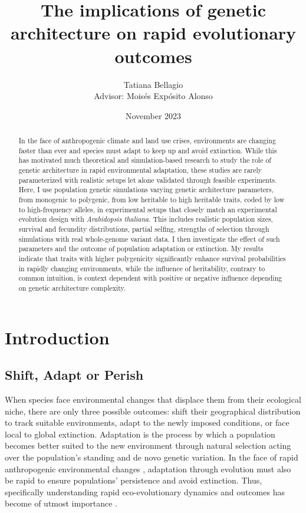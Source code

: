 \documentclass{article}
\title{The implications of genetic architecture on rapid evolutionary outcomes} %
\author{Tatiana Bellagio \\ Advisor: Moisés Expósito Alonso}
\date{November 2023}
\begin{document}
\maketitle

\begin{abstract}
In the face of anthropogenic climate and land use crises, environments are changing faster than ever and species must adapt to keep up and avoid extinction. While this has motivated much theoretical and simulation-based research to study the role of genetic architecture in rapid environmental adaptation, these studies are rarely parameterized with realistic setups let alone validated through feasible experiments. Here, I use population genetic simulations varying genetic architecture parameters, from monogenic to polygenic, from low heritable to high heritable traits, coded by low to high-frequency alleles, in experimental setups that closely match an experimental evolution design with \textit{Arabidopsis thaliana}. This includes realistic population sizes, survival and fecundity distributions, partial selfing, strengths of selection through simulations with real whole-genome variant data. I then investigate the effect of such parameters and the outcome of population adaptation or extinction. My results indicate that traits with higher polygenicity significantly enhance survival probabilities in rapidly changing environments, while the influence of heritability, contrary to common intuition, is context dependent with positive or negative influence depending on genetic architecture complexity.
\end{abstract}
\newpage %
\tableofcontents
\newpage %

\section{Introduction}
\subsection{Shift, Adapt or Perish}
When species face environmental changes that displace them from their ecological niche, there are only three possible outcomes: shift their geographical distribution to track suitable environments, adapt to the newly imposed conditions, or face local to global extinction. Adaptation is the process by which a population becomes better suited to the new environment through natural selection acting over the population's standing and de novo genetic variation. In the face of rapid anthropogenic environmental changes \citep{IPCC2023}, adaptation through evolution must also be rapid to ensure populations' persistence and avoid extinction. Thus, specifically understanding rapid eco-evolutionary dynamics and outcomes has become of utmost importance \citep{Waldvogel2020-dh, Palumbi2002-li, Stockwell2003-da}. 
\end{document}

